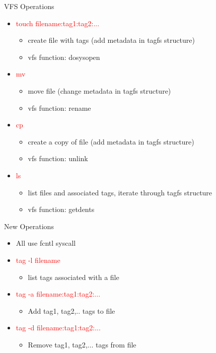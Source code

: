 \documentclass{beamer}
\begin{document}
\begin{frame}{VFS Operations}
    \begin{itemize}
        \item \textcolor{red}{touch filename:tag1:tag2:...}
            \begin{itemize}
                \item{create file with tags (add metadata in tagfs structure)}
                \item{vfs function: dosysopen}
            \end{itemize}
        \item \textcolor{red}{mv}
            \begin{itemize}
                \item{move file (change metadata in tagfs structure)}
                \item{vfs function: rename}
            \end{itemize}
        \item \textcolor{red}{cp}
            \begin{itemize}
                \item{create a copy of file (add metadata in tagfs structure)}
                \item{vfs function: unlink}
            \end{itemize}
        \item \textcolor{red}{ls}
            \begin{itemize}
                \item{list files and associated tags, iterate through tagfs structure}
                \item{vfs function: getdents}
            \end{itemize}
    \end{itemize}
\end{frame}

\begin{frame}{New Operations}
    \begin{itemize}
        \item {All use fcntl syscall}
        \item \textcolor{red}{ tag -l filename}
            \begin{itemize}
                \item{list tags associated with a file}
            \end{itemize}
        \item \textcolor{red}{ tag -a filename:tag1:tag2:...}
            \begin{itemize}
                \item{Add tag1, tag2,.. tags to file}
            \end{itemize}
        \item \textcolor{red}{ tag -d filename:tag1:tag2:...}
            \begin{itemize}
                \item{Remove tag1, tag2,... tags from file}
            \end{itemize}
    \end{itemize}
\end{frame}
\end{document}
